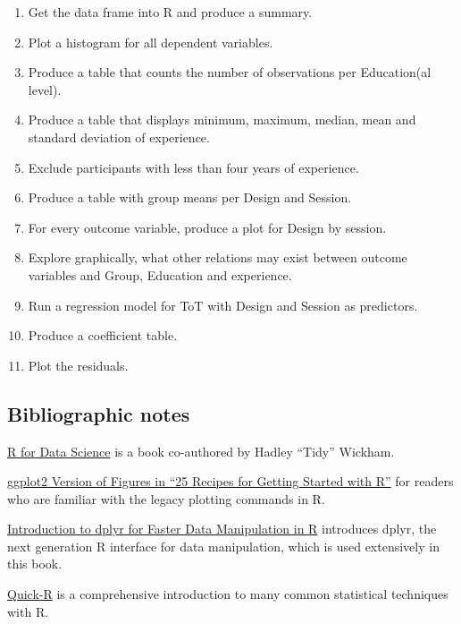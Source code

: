 \documentclass[]{svmono}
\providecommand{\tightlist}{%
  \setlength{\itemsep}{0pt}\setlength{\parskip}{0pt}}
\theoremstyle{definition}
\theoremstyle{definition}
\theoremstyle{definition}
\theoremstyle{remark}
\begin{document}
\begin{enumerate}
  \begin{enumerate}
  \def\labelenumii{\arabic{enumii}.}
  \tightlist
  \item
    Get the data frame into R and produce a summary.
  \item
    Plot a histogram for all dependent variables.
  \item
    Produce a table that counts the number of observations per
    Education(al level).
  \item
    Produce a table that displays minimum, maximum, median, mean and
    standard deviation of experience.
  \item
    Exclude participants with less than four years of experience.
  \item
    Produce a table with group means per Design and Session.
  \item
    For every outcome variable, produce a plot for Design by session.
  \item
    Explore graphically, what other relations may exist between outcome
    variables and Group, Education and experience.
  \item
    Run a regression model for ToT with Design and Session as
    predictors.
  \item
    Produce a coefficient table.
  \item
    Plot the residuals.
  \end{enumerate}
\end{enumerate}

\subsection{Bibliographic notes}\label{bibliographic-notes-1}

\href{http://r4ds.had.co.nz/}{R for Data Science} is a book co-authored
by Hadley ``Tidy'' Wickham.

\href{http://www.r-bloggers.com/ggplot2-version-of-figures-in-\%E2\%80\%9C25-recipes-for-getting-started-with-r\%E2\%80\%9D/}{ggplot2
Version of Figures in ``25 Recipes for Getting Started with R''} for
readers who are familiar with the legacy plotting commands in R.

\href{http://rpubs.com/justmarkham/dplyr-tutorial}{Introduction to dplyr
for Faster Data Manipulation in R} introduces dplyr, the next generation
R interface for data manipulation, which is used extensively in this
book.

\href{http://www.statmethods.net/}{Quick-R} is a comprehensive
introduction to many common statistical techniques with R.
\end{document}
